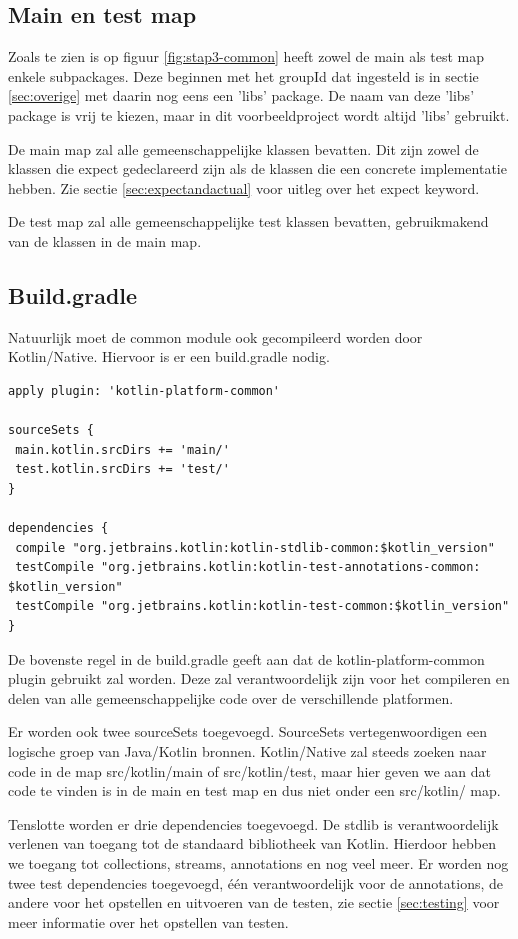 \subsection{Main en test map}
\label{sec:maintestcommon}
Zoals te zien is op figuur \ref{fig:stap3-common} heeft zowel de main als test map enkele subpackages. Deze beginnen met het groupId dat ingesteld is in sectie \ref{sec:overige} met daarin nog eens een 'libs' package. De naam van deze 'libs' package is vrij te kiezen, maar in dit voorbeeldproject wordt altijd 'libs' gebruikt.

De main map zal alle gemeenschappelijke klassen bevatten. Dit zijn zowel de klassen die expect gedeclareerd zijn als de klassen die een concrete implementatie hebben. Zie sectie \ref{sec:expectandactual} voor uitleg over het expect keyword.

De test map zal alle gemeenschappelijke test klassen bevatten, gebruikmakend van de klassen in de main map.

\subsection{Build.gradle}
\label{sec:gradlecommon}
Natuurlijk moet de common module ook gecompileerd worden door Kotlin/Native. Hiervoor is er een build.gradle nodig.

\begin{lstlisting}
apply plugin: 'kotlin-platform-common'

sourceSets {
 main.kotlin.srcDirs += 'main/'
 test.kotlin.srcDirs += 'test/'
}

dependencies {
 compile "org.jetbrains.kotlin:kotlin-stdlib-common:$kotlin_version"
 testCompile "org.jetbrains.kotlin:kotlin-test-annotations-common: $kotlin_version"
 testCompile "org.jetbrains.kotlin:kotlin-test-common:$kotlin_version"
}
\end{lstlisting}
De bovenste regel in de build.gradle geeft aan dat de kotlin-platform-common plugin gebruikt zal worden. Deze zal verantwoordelijk zijn voor het compileren en delen van alle gemeenschappelijke code over de verschillende platformen.

Er worden ook twee sourceSets toegevoegd. SourceSets vertegenwoordigen een logische groep van Java/Kotlin bronnen. Kotlin/Native zal steeds zoeken naar code in de map src/kotlin/main of src/kotlin/test, maar hier geven we aan dat code te vinden is in de main en test map en dus niet onder een src/kotlin/ map.

Tenslotte worden er drie dependencies toegevoegd. De stdlib is verantwoordelijk verlenen van toegang tot de standaard bibliotheek van Kotlin. Hierdoor hebben we toegang tot collections, streams, annotations en nog veel meer. Er worden nog twee test dependencies toegevoegd, één verantwoordelijk voor de annotations, de andere voor het opstellen en uitvoeren van de testen, zie sectie \ref{sec:testing} voor meer informatie over het opstellen van testen.

